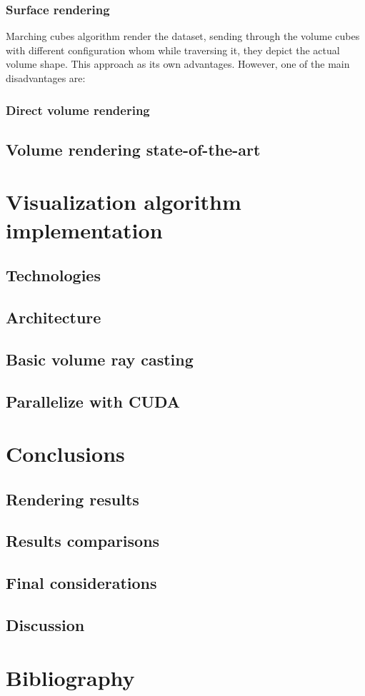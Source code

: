 \documentclass[10pt,a4paper]{article}
\begin{document}
\subsubsection{Surface rendering}
Marching cubes algorithm render the dataset, sending through the volume cubes with different configuration whom while traversing it, they depict the actual volume shape. This approach as its own advantages.
However, one of the main disadvantages are: 
\subsubsection{Direct volume rendering}
\subsection{Volume rendering state-of-the-art}
\section{Visualization algorithm implementation}
\subsection{Technologies}
\subsection{Architecture}
\subsection{Basic volume ray casting}
\subsection{Parallelize with CUDA}
\section{Conclusions}
\subsection{Rendering results}
\subsection{Results comparisons}
\subsection{Final considerations}
\subsection{Discussion}
\section{Bibliography}
\end{document}
